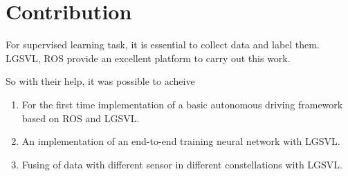 \section{Contribution}
For supervised learning task, it is essential to collect data and label them. LGSVL, ROS provide an excellent platform to carry out this work.

So with their help, it was possible to acheive
\begin{enumerate}
    \item For the first time implementation of a basic autonomous driving framework based on ROS and LGSVL.
    \item An implementation of an end-to-end training neural network with LGSVL.
    \item Fusing of data with different sensor in different constellations with LGSVL.
\end{enumerate}



